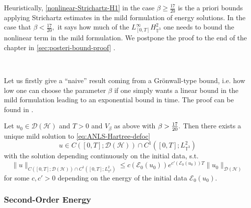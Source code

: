 Heuristically, \eqref{nonlinear-Strichartz-H1} in the case $\beta \geqslant
\frac{17}{20}$ is the a priori bounds applying Strichartz estimates in the
mild formulation of energy solutions. In the case that $\beta <
\frac{17}{20},$ it says how much of the $L_{[0, T]}^{\infty}
H_{\mathbb{T}^3}^2$ one needs to bound the nonlinear term in the mild
formulation. We postpone the proof to the end of the chapter in
\ref{sec:posteri-bound-proof} .

\

Let us firstly give a ``naive'' result coming from a Gr\"onwall-type bound,
i.e. how low one can choose the parameter $\beta$ if one simply wants a linear
bound in the mild formulation leading to an exponential bound in time. The proof can be found in \cite[Theorem 5.3]{de2025stochastic}.

\begin{thm}
  \label{thm:naivegwp}Let $u_0 \in \mathcal{D} (\mathcal{H})$ and $T > 0$ and
  $V_{\beta}$ as above with ${\color[HTML]{000000}\beta > \frac{17}{20}} .$
  Then there exists a unique mild solution to \eqref{eq:ANLS-Hartree-defoc}
  \[ u \in C ([0, T] ; \mathcal{D} (\mathcal{H})) \cap C^1 ([0, T] ;
     L_{\mathbb{T}^3}^2) \]
  with the solution depending continuously on the initial data, s.t.
  \[ \| u \|_{C ([0, T] ; \mathcal{D} (\mathcal{H})) \cap C^1 ([0, T] ;
     L_{\mathbb{T}^3}^2)} \leqslant c (\mathcal{E}_0 (u_0)) e^{c'
     (\mathcal{E}_0 (u_0)) T} \| u_0 \|_{\mathcal{D} (\mathcal{H})}\]
     for some $c, c' > 0$ depending on the energy of the initial data
  $\mathcal{E}_0 (u_0)$.
\end{thm}

\subsubsection{Second-Order Energy}

